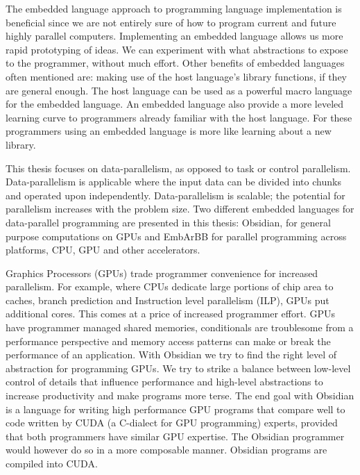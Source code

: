 \documentclass[a4paper]{book}
\begin{document}
The embedded language approach to programming language implementation is beneficial 
since we are not entirely sure of how to program current and future highly parallel 
computers. Implementing an embedded language allows us more rapid prototyping of ideas. 
We can experiment with what abstractions to expose to the programmer, without much 
effort. Other benefits of embedded languages often mentioned are: making use 
of the host language's library functions, if they are general enough. The host language 
can be used as a powerful macro language for the embedded language. An embedded 
language also provide a more leveled learning curve to programmers already familiar 
with the host language. For these programmers using an embedded language is more like  
learning about a new library. 

This thesis focuses on data-parallelism, as opposed to task or control parallelism.
Data-parallelism is applicable where the input data can be divided into chunks
and operated upon independently. Data-parallelism is scalable; the potential 
for parallelism increases with the problem size. Two different embedded languages 
for data-parallel programming are presented in this thesis: Obsidian, for 
general purpose computations on GPUs and EmbArBB for parallel programming across 
platforms, CPU, GPU and other accelerators. 

Graphics Processors (GPUs) trade programmer convenience for increased parallelism. 
For example, where CPUs dedicate large portions of chip area to caches, branch 
prediction and Instruction level parallelism (ILP), GPUs put additional cores. 
This comes at a price of increased programmer effort. GPUs have programmer managed 
shared memories, conditionals are troublesome from a performance 
perspective and memory access patterns can make or break the performance of an 
application. With Obsidian we try to find the right level of abstraction for 
programming GPUs. We try to strike a balance between low-level control of details 
that influence performance and high-level abstractions to increase productivity and 
make programs more terse. The end goal with Obsidian is a language for writing 
high performance GPU programs that compare well to code written by CUDA 
(a C-dialect for GPU programming) experts, provided that both programmers have 
similar GPU expertise. The Obsidian programmer would however do so in a more 
composable manner. Obsidian programs are compiled into CUDA.  
\end{document}
